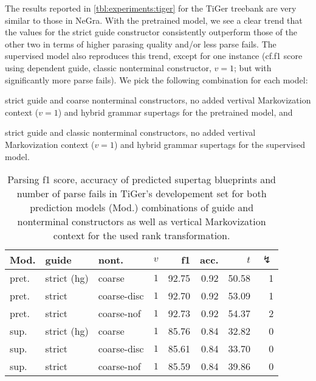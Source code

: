 \documentclass[../../document.tex]{subfiles}
\begin{document}
    The results reported in \cref{tbl:experiments:tiger} for the TiGer treebank are very similar to those in NeGra.
    With the pretrained model, we see a clear trend that the values for the strict guide constructor consistently outperform those of the other two in terms of higher parasing quality and/or less parse fails.
    The supervised model also reproduces this trend, except for one instance (cf.\@ f1 score using dependent guide, classic nonterminal constructor, $v=1$; but with significantly more parse fails).
    We pick the following combination for each model:
    \begin{compactitem}
        \item strict guide and coarse nonterminal constructors, no added vertival Markovization context ($v=1$) and hybrid grammar supertags for the pretrained model, and
        \item strict guide and classic nonterminal constructors, no added vertival Markovization context ($v=1$) and hybrid grammar supertags for the supervised model.
    \end{compactitem}

    \begin{table}
        \caption{\label{tbl:experiments:tiger:dcp}
        Parsing f1 score, accuracy of predicted  supertag blueprints and number of parse fails in TiGer's developement set for both prediction models (Mod.) combinations of guide and nonterminal constructors as well as vertical Markovization context for the used rank transformation.
        }
        \centering
        \setlength{\tabcolsep}{4pt}
        \vspace{.2cm}
        \begin{tabular}{lllc|rrrr}
            \toprule
Mod. &  guide &   nont.   &\(v\)   & f1 & acc. & $t$ & $\lightning$ \\ \hline \rowcolor{black!10}
pret. & strict (hg) &  coarse & \(1\)  & 92.75 & 0.92 & 50.58 & 1  \\\hline
pret. & strict    &  coarse-disc & \(1\)  & 92.70 & 0.92 & 53.09 & 1  \\
pret. & strict     &  coarse-nof & \(1\)  & 92.73 & 0.92 & 54.37 & 2  \\
\midrule \rowcolor{black!10}
sup. & strict (hg) &  coarse & \(1\)  & 85.76 & 0.84 & 32.82 & 0  \\\hline
sup. & strict    &  coarse-disc & \(1\)  & 85.61 & 0.84 & 33.70 & 0  \\
sup. & strict     &  coarse-nof & \(1\)  & 85.59 & 0.84 & 39.86 & 0  \\
    \bottomrule
        \end{tabular}
    \end{table}
\end{document}
